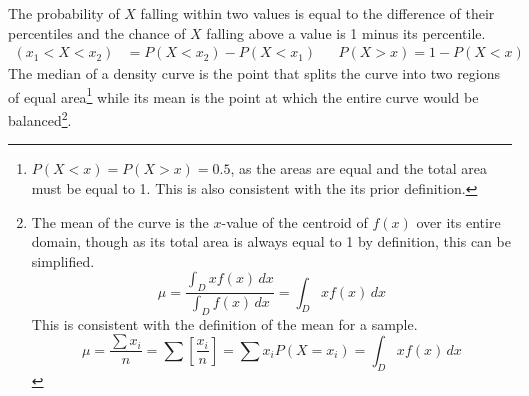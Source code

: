 \documentclass[../AP_Statistics.tex]{subfiles}
\begin{document}
			The probability of $X$ falling within two values is equal to the difference of their percentiles and the chance of $X$ falling above a value is 1 minus its percentile.
			\begin{align*}
				(x_1 < X < x_2) &= P(X < x_2) - P(X < x_1) && P(X > x) = 1 - P(X < x)
			\end{align*}
			The median of a density curve is the point that splits the curve into two regions of equal area\footnote{$P(X < x) = P(X > x) = 0.5$, as the areas are equal and the total area must be equal to 1. This is also consistent with the its prior definition.} while its mean is the point at which the entire curve would be balanced\footnote{The mean of the curve is the $x$-value of the centroid of $f(x)$ over its entire domain, though as its total area is always equal to 1 by definition, this can be simplified.$$\mu = \frac{\int_Dxf(x)\,dx}{\int_Df(x)\,dx} = \int_{D}xf(x)\,dx$$This is consistent with the definition of the mean for a sample.$$\mu = \frac{\sum x_i}{n} = \sum\left[\frac{x_i}{n}\right] = \sum x_iP(X = x_i) = \int_Dxf(x)\,dx$$}.
\end{document}
